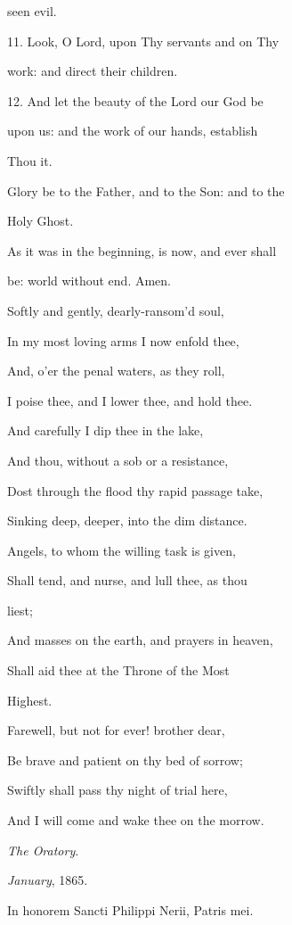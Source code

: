 seen evil.

11. Look, O Lord, upon Thy servants and on Thy

work: and direct their
children.

12. And let the beauty of the Lord our God be

upon us: and the work of
our hands, establish

Thou it.

Glory be to the Father, and to the Son: and to the

Holy Ghost.

As it was in the beginning, is now, and ever shall

be: world without end.
Amen.


Softly and gently, dearly-ransom'd soul,

In my most loving arms I
now enfold thee,

And, o'er the penal waters, as they roll,

I poise thee, and I lower
thee, and hold thee.

And carefully I dip thee in the lake,

And thou, without a sob
or a resistance,

Dost through the flood thy rapid passage take,

Sinking deep, deeper,
into the dim distance. 

Angels, to whom the willing task is given,

Shall tend, and nurse,
and lull thee, as thou

liest;

And masses on the earth, and prayers in heaven,

Shall aid thee at the
Throne of the Most

Highest.

Farewell, but not for ever! brother dear,

Be brave and patient on
thy bed of sorrow;

Swiftly shall pass thy night of trial here,

And I will come and wake
thee on the morrow.

\emph{The Oratory}.

\emph{January}, 1865.


In honorem Sancti Philippi Nerii, Patris mei.


